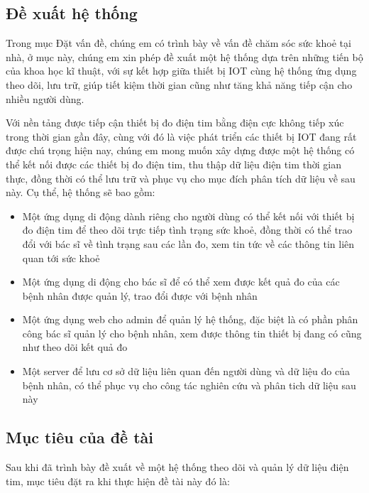 \subsection*{Đề xuất hệ thống}

Trong mục Đặt vấn đề, chúng em có trình bày về vấn đề chăm sóc sức khoẻ tại nhà, ở mục này, chúng em xin phép đề xuất một hệ thống
dựa trên những tiến bộ của khoa học kĩ thuật, với sự kết hợp giữa thiết bị IOT cùng hệ thống ứng dụng theo dõi, lưu trữ,
giúp tiết kiệm thời gian cũng như tăng khả năng tiếp cận cho nhiều người dùng. 

Với nền tảng được tiếp cận thiết bị đo điện tim bằng điện cực không tiếp xúc trong thời gian gần đây, 
cùng với đó là việc phát triển các thiết bị IOT đang rất được chú trọng hiện nay, chúng em mong muốn xây dựng được một hệ thống
có thể kết nối được các thiết bị đo điện tim, thu thập dữ liệu điện tim thời gian thực, đồng thời có thể lưu trữ và phục vụ cho mục đích
phân tích dữ liệu về sau này. Cụ thể, hệ thống sẽ bao gồm:

\begin{adjustwidth}{1.5em}{}
  \begin{itemize}
      \item Một ứng dụng di động dành riêng cho người dùng có thể kết nối với thiết bị đo điện tim để theo dõi trực tiếp tình trạng sức khoẻ, đồng
      thời có thể trao đổi với bác sĩ về tình trạng sau các lần đo, xem tin tức về các thông tin liên quan tới sức khoẻ
      \item Một ứng dụng di động cho bác sĩ để có thể xem được kết quả đo của các bệnh nhân được quản lý, trao đổi được với bệnh nhân
      \item Một ứng dụng web cho admin để quản lý hệ thống, đặc biệt là có phần phân công bác sĩ quản lý cho bệnh nhân, xem được thông tin thiết bị đang có cũng như theo dõi kết quả đo
      \item Một server để lưu cơ sở dữ liệu liên quan đến người dùng và dữ liệu đo của bệnh nhân, có thể phục vụ cho công tác nghiên cứu và
      phân tich dữ liệu sau này
  \end{itemize}
  \end{adjustwidth}


\subsection*{Mục tiêu của đề tài}
Sau khi đã trình bày đề xuất về một hệ thống theo dõi và quản lý dữ liệu điện tim, mục tiêu đặt ra khi thực hiện
đề tài này đó là:

